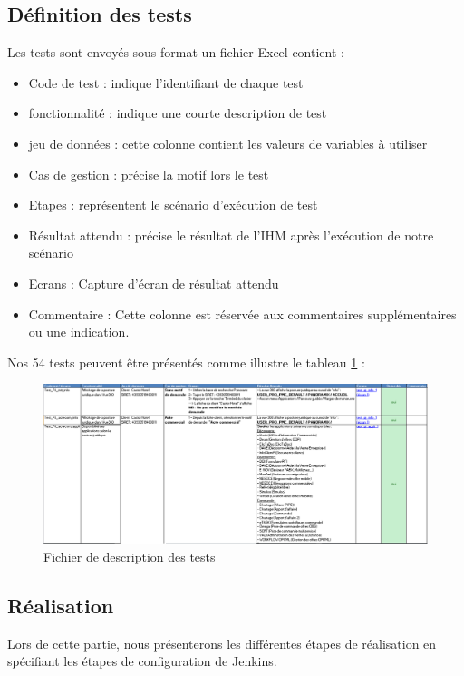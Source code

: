 \subsection{Définition des tests}
Les tests sont envoyés sous format un fichier Excel contient :
\begin{itemize}
	\item Code de test : indique l’identifiant de chaque test
	\item fonctionnalité : indique une courte description de test
	\item jeu de données : cette colonne contient les valeurs de variables à utiliser
	\item Cas de gestion : précise la motif lors le test
	\item Etapes : représentent le scénario d'exécution de test
	\item Résultat attendu : précise le résultat de l’IHM après l'exécution de notre scénario  
	\item Ecrans : Capture d’écran de résultat attendu 
	\item Commentaire : Cette colonne est réservée aux commentaires supplémentaires ou une indication.
\end{itemize}
Nos 54 tests peuvent être présentés comme illustre le tableau \ref{fig:excel-robot} :
\begin{figure}[H]
	\centering
	\includegraphics[width=1\linewidth]{"img/excel robot"}
	\caption[Fichier de description des tests]{Fichier de description des tests}
	\label{fig:excel-robot}
\end{figure}
\subsection{Réalisation}
Lors de cette partie, nous présenterons les différentes étapes de réalisation en spécifiant les étapes de configuration de Jenkins.
